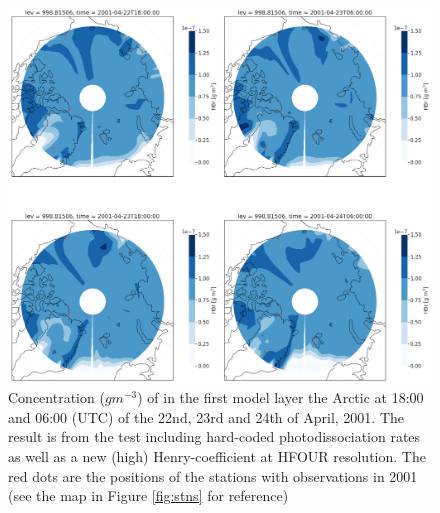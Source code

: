 \begin{figure}[h]
    \centering
    \includegraphics[width=\linewidth]{Chapter6_Results/images/polarHBr_step4.png}
    \caption{Concentration ($g m^{-3}$) of  in the first model layer the Arctic at 18:00 and 06:00 (UTC) of the 22nd, 23rd and 24th of April, 2001. The result is from the test including hard-coded photodissociation rates as well as a new (high) Henry-coefficient at HFOUR resolution. The red dots are the positions of the stations with observations in 2001 (see the map in Figure \ref{fig:stns} for reference)}
    \label{fig:polarHBr_step4}
\end{figure}